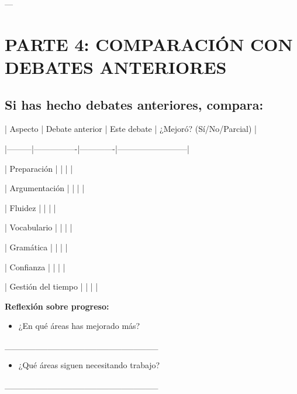 \documentclass[a4paper,11pt]{article}
\begin{document}
\vspace{0.2cm}

---

\vspace{0.2cm}

\section{PARTE 4: COMPARACIÓN CON DEBATES ANTERIORES}

\vspace{0.2cm}

\subsection{Si has hecho debates anteriores, compara:}

\vspace{0.2cm}

| Aspecto | Debate anterior | Este debate | ¿Mejoró? (Sí/No/Parcial) |

|---------|----------------|-------------|--------------------------|

| Preparación | | | |

| Argumentación | | | |

| Fluidez | | | |

| Vocabulario | | | |

| Gramática | | | |

| Confianza | | | |

| Gestión del tiempo | | | |

\vspace{0.2cm}

\textbf{Reflexión sobre progreso:}

\begin{itemize}

  \item ¿En qué áreas has mejorado más?

\end{itemize}

_________________________

\begin{itemize}

  \item ¿Qué áreas siguen necesitando trabajo?

\end{itemize}

_________________________

\vspace{0.2cm}
\end{document}
